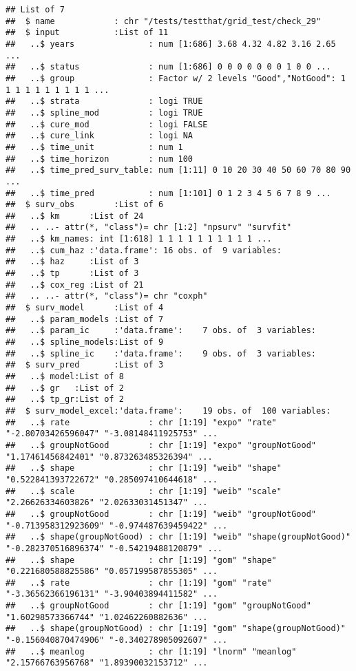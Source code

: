 \documentclass[
]{article}
\begin{document}
\begin{verbatim}
## List of 7
##  $ name            : chr "/tests/testthat/grid_test/check_29"
##  $ input           :List of 11
##   ..$ years               : num [1:686] 3.68 4.32 4.82 3.16 2.65 ...
##   ..$ status              : num [1:686] 0 0 0 0 0 0 0 1 0 0 ...
##   ..$ group               : Factor w/ 2 levels "Good","NotGood": 1 1 1 1 1 1 1 1 1 1 ...
##   ..$ strata              : logi TRUE
##   ..$ spline_mod          : logi TRUE
##   ..$ cure_mod            : logi FALSE
##   ..$ cure_link           : logi NA
##   ..$ time_unit           : num 1
##   ..$ time_horizon        : num 100
##   ..$ time_pred_surv_table: num [1:11] 0 10 20 30 40 50 60 70 80 90 ...
##   ..$ time_pred           : num [1:101] 0 1 2 3 4 5 6 7 8 9 ...
##  $ surv_obs        :List of 6
##   ..$ km      :List of 24
##   .. ..- attr(*, "class")= chr [1:2] "npsurv" "survfit"
##   ..$ km_names: int [1:618] 1 1 1 1 1 1 1 1 1 1 ...
##   ..$ cum_haz :'data.frame': 16 obs. of  9 variables:
##   ..$ haz     :List of 3
##   ..$ tp      :List of 3
##   ..$ cox_reg :List of 21
##   .. ..- attr(*, "class")= chr "coxph"
##  $ surv_model      :List of 4
##   ..$ param_models :List of 7
##   ..$ param_ic     :'data.frame':    7 obs. of  3 variables:
##   ..$ spline_models:List of 9
##   ..$ spline_ic    :'data.frame':    9 obs. of  3 variables:
##  $ surv_pred       :List of 3
##   ..$ model:List of 8
##   ..$ gr   :List of 2
##   ..$ tp_gr:List of 2
##  $ surv_model_excel:'data.frame':    19 obs. of  100 variables:
##   ..$ rate                : chr [1:19] "expo" "rate" "-2.80703426596047" "-3.08148411925753" ...
##   ..$ groupNotGood        : chr [1:19] "expo" "groupNotGood" "1.17461456842401" "0.873263485326394" ...
##   ..$ shape               : chr [1:19] "weib" "shape" "0.522841393722672" "0.285097410644618" ...
##   ..$ scale               : chr [1:19] "weib" "scale" "2.26626334603826" "2.02633031451347" ...
##   ..$ groupNotGood        : chr [1:19] "weib" "groupNotGood" "-0.713958312923609" "-0.974487639459422" ...
##   ..$ shape(groupNotGood) : chr [1:19] "weib" "shape(groupNotGood)" "-0.282370516896374" "-0.54219488120879" ...
##   ..$ shape               : chr [1:19] "gom" "shape" "0.221680588825586" "0.057199587855305" ...
##   ..$ rate                : chr [1:19] "gom" "rate" "-3.36562366196131" "-3.90403894411582" ...
##   ..$ groupNotGood        : chr [1:19] "gom" "groupNotGood" "1.60298573366744" "1.02462260882636" ...
##   ..$ shape(groupNotGood) : chr [1:19] "gom" "shape(groupNotGood)" "-0.156040870474906" "-0.340278905092607" ...
##   ..$ meanlog             : chr [1:19] "lnorm" "meanlog" "2.15766763956768" "1.89390032153712" ...

\end{verbatim}
\end{document}
